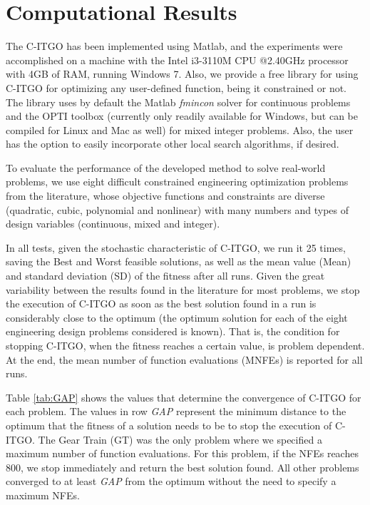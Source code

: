 \section{Computational Results} \label{sec:Results}

The C-ITGO has been implemented using Matlab, and the experiments were accomplished on a machine with the Intel i3-3110M CPU @2.40GHz processor with 4GB of RAM, running Windows 7. Also, we provide a free library for using C-ITGO for optimizing any user-defined function, being it constrained or not. The library uses by default the Matlab \textit{fmincon} solver for continuous problems and the OPTI toolbox (currently only readily available for Windows, but can be compiled for Linux and Mac as well) for mixed integer problems. Also, the user has the option to easily incorporate other local search algorithms, if desired.


To evaluate the performance of the developed method to solve real-world problems, we use eight difficult constrained engineering optimization problems from the literature, whose objective functions and constraints are diverse (quadratic, cubic, polynomial and nonlinear) with many numbers and types of design variables (continuous, mixed and integer). 

In all tests, given the stochastic characteristic of C-ITGO, we run it 25 times, saving the Best and Worst feasible solutions, as well as the mean value (Mean) and standard deviation (SD) of the fitness after all runs. Given the great variability between the results found in the literature for most problems, we stop the execution of C-ITGO as soon as the best solution found in a run is considerably close to the optimum (the optimum solution for each of the eight engineering design problems considered is known). That is, the condition for stopping C-ITGO, when the fitness reaches a certain value, is problem dependent. At the end, the mean number of function evaluations (MNFEs) is reported for all runs.

Table \ref{tab:GAP} shows the values that determine the convergence of C-ITGO for each problem. The values in row \textit{GAP} represent the minimum distance to the optimum that the fitness of a solution needs to be to stop the execution of C-ITGO. The Gear Train (GT) was the only problem where we specified a maximum number of function evaluations. For this problem, if the NFEs reaches 800, we stop immediately and return the best solution found. All other problems converged to at least \textit{GAP} from the optimum without the need to specify a maximum NFEs.


